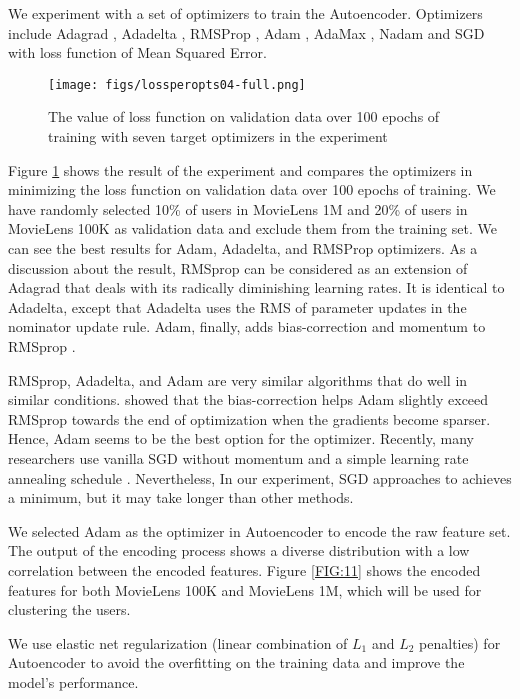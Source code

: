 \documentclass[a4paper,fleqn]{cas-dc}
\begin{document}
We experiment with a set of optimizers to train the Autoencoder. Optimizers include Adagrad \citep{63duchi2011adaptive}, Adadelta \citep{64zeiler2012adadelta}, RMSProp \citep{65hinton2012neural}, Adam \citep{66kingma2014adam}, AdaMax \citep{66kingma2014adam}, Nadam \citep{67dozat2016incorporating} and SGD \citep{86bottou2008tradeoffs} with loss function of Mean Squared Error.

\begin{figure}
	\centering
	\texttt{[image: figs/lossperopts04-full.png]}
	\caption{The value of loss function on validation data over 100 epochs of training with seven target optimizers in the experiment}
	\label{FIG:09}
\end{figure}

Figure \ref{FIG:09} shows the result of the experiment and compares the optimizers in minimizing the loss function on validation data over 100 epochs of training. We have randomly selected 10\% of users in MovieLens 1M and 20\% of users in MovieLens 100K as validation data and exclude them from the training set. We can see the best results for Adam, Adadelta, and RMSProp optimizers. As a discussion about the result, RMSprop can be considered as an extension of Adagrad that deals with its radically diminishing learning rates. It is identical to Adadelta, except that Adadelta uses the RMS of parameter updates in the nominator update rule. Adam, finally, adds bias-correction and momentum to RMSprop \citep{69ruder2016overview}.

RMSprop, Adadelta, and Adam are very similar algorithms that do well in similar conditions. \citet{66kingma2014adam} showed that the bias-correction helps Adam slightly exceed RMSprop towards the end of optimization when the gradients become sparser. Hence, Adam seems to be the best option for the optimizer.  Recently, many researchers use vanilla SGD without momentum and a simple learning rate annealing schedule \citep{69ruder2016overview}. Nevertheless, In our experiment, SGD approaches to achieves a minimum, but it may take longer than other methods.

We selected Adam as the optimizer in Autoencoder to encode the raw feature set. The output of the encoding process shows a diverse distribution with a low correlation between the encoded features. Figure \ref{FIG:11} shows the encoded features for both MovieLens 100K and MovieLens 1M, which will be used for clustering the users.

We use elastic net regularization (linear combination of $L_1$ and $L_2$ penalties) \citep{87zou2005regularization} for Autoencoder to avoid the overfitting on the training data and improve the model's performance.
\end{document}

